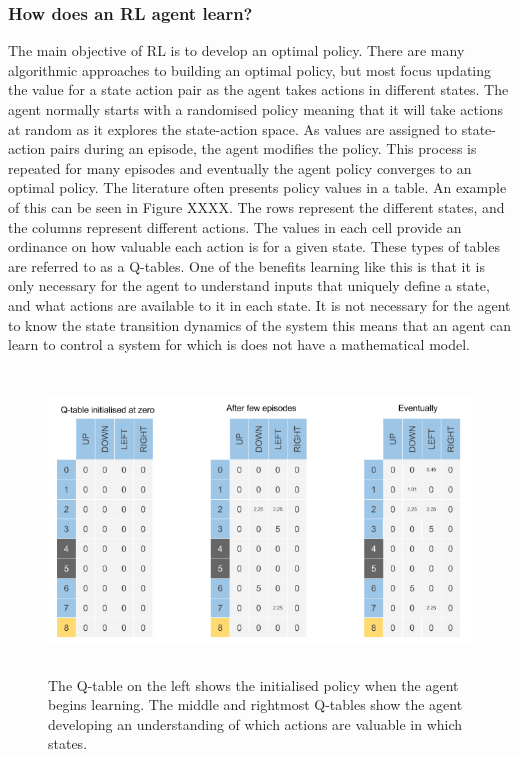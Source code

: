 \documentclass[12pt, a4paper]{article}
\begin{document}
\subsubsection{How does an RL agent learn?}
The main objective of RL is to develop an optimal policy. There are many algorithmic approaches to building an optimal policy, but most focus updating the value for a state action pair as the agent takes actions in different states. The agent normally starts with a randomised policy meaning that it will take actions at random as it explores the state-action space. As values are assigned to state-action pairs during an episode, the agent modifies the policy. This process is repeated for many episodes and eventually the agent policy converges to an optimal policy. The literature often presents policy values in a table. An example of this can be seen in Figure XXXX. The rows represent the different states, and the columns represent different actions. The values in each cell provide an ordinance on how valuable each action is for a given state. These types of tables are referred to as a Q-tables. One of the benefits learning like this is that it is only necessary for the agent to understand inputs that uniquely define a state, and what actions are available to it in each state. It is not necessary for the agent to know the state transition dynamics of the system this means that an agent can learn to control a system for which is does not have a mathematical model.
\begin{figure}
	\centering
	\includegraphics[height=8cm]{q_table}
	\caption{The Q-table on the left shows the initialised policy when the agent begins learning. The middle and rightmost Q-tables show the agent developing an understanding of which actions are valuable in which states.\cite{towards2020}}
\end{figure}
\end{document}
